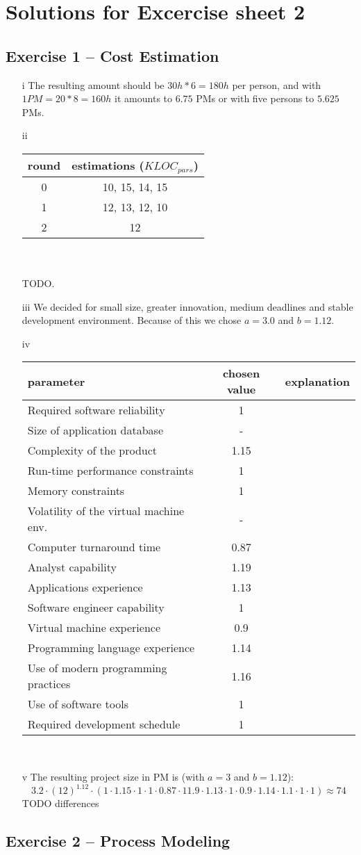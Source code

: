 \documentclass{scrartcl}
\begin{document}
\section*{Solutions for Excercise sheet 2}

\subsection*{Exercise 1 – Cost Estimation}
\begin{itemize}
	\item[i]
	The resulting amount should be $30h*6=180h$ per person, and with $1 PM=20*8=160h$ it amounts to $6.75$ PMs or with five persons to $5.625$ PMs.\\
	\item[ii]
	\begin{tabular} {| c | c |}
		round & estimations ($KLOC_{pars}$)\\
		\hline
		0 & 10, 15, 14, 15 \\
		1 & 12, 13, 12, 10\\
		2 & 12\\
	\end{tabular}\\\\
	TODO. \\
	\item[iii]
	We decided for small size, greater innovation, medium deadlines and stable development environment. Because of this we chose $a=3.0$ and $b=1.12$.
	\item[iv]
	\begin{tabular}{l | c | c}
		parameter & chosen value & explanation\\
		\hline
		Required software reliability & 1&\\
		Size of application database & -&\\
		Complexity of the product & 1.15&\\
		Run-time performance constraints  & 1&\\
		Memory constraints & 1&\\
		Volatility of the virtual machine env. & -&\\
		Computer turnaround time & 0.87&\\
		Analyst capability & 1.19\\
		Applications experience & 1.13&\\
		Software engineer capability & 1&\\
		Virtual machine experience & 0.9&\\
		Programming language experience & 1.14&\\
		Use of modern programming practices & 1.16\\
		Use of software tools & 1&\\
		Required development schedule & 1&\\
	\end{tabular}\\
	\item[v]
	The resulting project size in PM is (with $a=3$ and $b=1.12$):
	\[3.2 \cdot (12)^{1.12}\cdot (1\cdot 1.15 \cdot 1 \cdot 1 \cdot 0.87 \cdot 11.9 \cdot 1.13 \cdot 1 \cdot 0.9 \cdot 1.14 \cdot 1.1 \cdot 1 \cdot 1) \approx 74\]
	TODO differences
\end{itemize}

\subsection*{Exercise 2 – Process Modeling}
\end{document}
